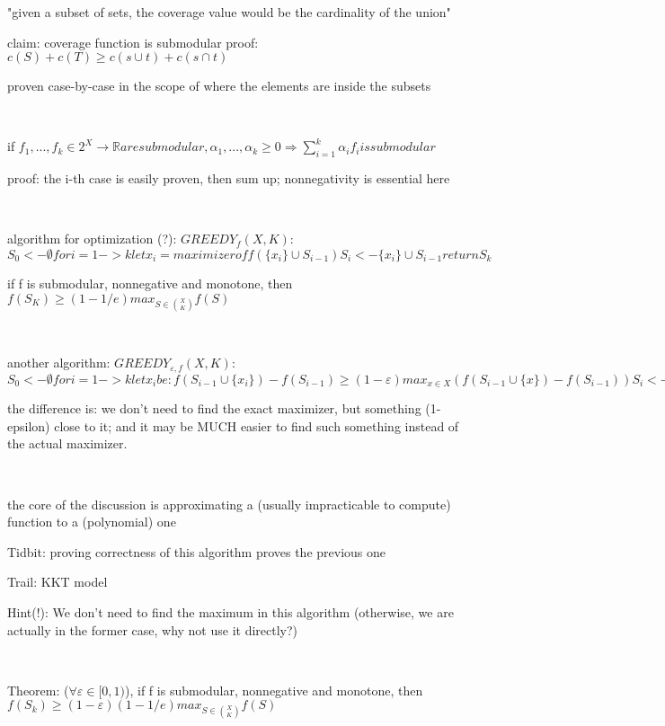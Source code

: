 \documentclass{report}
\begin{document}
	"given a subset of sets, the coverage value would be the cardinality of the union"
	
	claim: coverage function is submodular
	proof: $c(S)+c(T) \geq c(s\cup t) + c(s \cap t)$
	
	proven case-by-case in the scope of where the elements are inside the subsets
	
	\
	
	if $f_1, ..., f_k \in 2^X \to \mathbb{R} are submodular, \alpha_1, ..., \alpha_k \geq 0 \Rightarrow \sum_{i=1}^{k}\alpha_i f_i is submodular$
	
	proof: the i-th case is easily proven, then sum up; nonnegativity is essential here
	
	\
	
	algorithm for optimization (?): $GREEDY_f(X, K)$:
	$
	S_0 <- \emptyset
	for i=1 -> k
		let x_i = maximizer of f(\{x_i\} \cup S_{i-1})
		S_i <- \{x_i\} \cup S_{i-1}		
	return S_k
	$
	
	if f is submodular, nonnegative and monotone, then $\displaystyle f(S_K)\geq(1-1/e)max_{S \in \binom{X}{K}}f(S)$
	
	\
	
	another algorithm: $GREEDY_{\varepsilon, f}(X, K)$:
	$
	S_0 <- \emptyset
	for i=1 -> k
		let x_i be : f(S_{i-1} \cup \{x_i\}) - f(S_{i-1}) \geq (1-\varepsilon)max_{x \in X} (f(S_{i-1} \cup \{x\}) - f(S_{i-1})) %
		S_i <- \{x_i\} \cup S_{i-1}		
	return S_k
	$
	
	the difference is: we don't need to find the exact maximizer, but something (1-epsilon) close to it; and it may be MUCH easier to find such something instead of the actual maximizer.
	
	\
	
	the core of the discussion is approximating a (usually impracticable to compute) function to a (polynomial) one
	
	Tidbit: proving correctness of this algorithm proves the previous one
	
	Trail: KKT model
	
	Hint(!): We don't need to find the maximum in this algorithm (otherwise, we are actually in the former case, why not use it directly?)
	
	\
	
	Theorem: ($\forall \varepsilon \in [0, 1)$), if f is submodular, nonnegative and monotone, then $f(S_k) \geq (1-\varepsilon)(1-1/e)max_{S \in \binom{X}{K}}f(S)$
\end{document}
